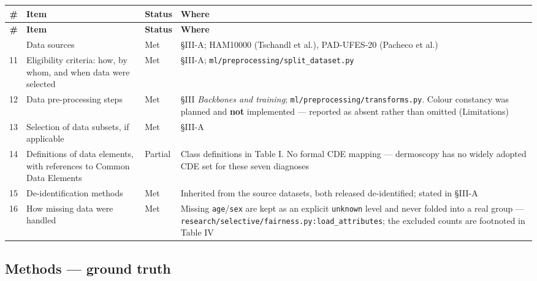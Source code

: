 \begin{longtable}{@{}rp{}lp{}@{}}
\toprule
\textbf{\#} & \textbf{Item} & \textbf{Status} & \textbf{Where} \\
\midrule
\endfirsthead
\toprule
\textbf{\#} & \textbf{Item} & \textbf{Status} & \textbf{Where} \\
\midrule
\endhead
\bottomrule
\endfoot
10 & Data sources & Met & \S{}III-A; HAM10000 (Tschandl et al.), PAD-UFES-20 (Pacheco et al.) \\
11 & Eligibility criteria: how, by whom, and when data were selected & Met & \S{}III-A; \texttt{ml/preprocessing/split\_dataset.py} \\
12 & Data pre-processing steps & Met & \S{}III \emph{Backbones and training}; \texttt{ml/preprocessing/transforms.py}. Colour constancy was planned and \textbf{not} implemented --- reported as absent rather than omitted (Limitations) \\
13 & Selection of data subsets, if applicable & Met & \S{}III-A \\
14 & Definitions of data elements, with references to Common Data Elements & Partial & Class definitions in Table I. No formal CDE mapping --- dermoscopy has no widely adopted CDE set for these seven diagnoses \\
15 & De-identification methods & Met & Inherited from the source datasets, both released de-identified; stated in \S{}III-A \\
16 & How missing data were handled & Met & Missing \texttt{age}/\texttt{sex} are kept as an explicit \texttt{unknown} level and never folded into a real group --- \texttt{research/selective/fairness.py:load\_attributes}; the excluded counts are footnoted in Table IV \\
\end{longtable}


\subsection*{Methods --- ground truth}


